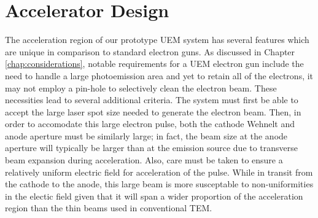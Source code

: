 
\section{Accelerator Design} \label{sec:gun_design}

The acceleration region of our prototype UEM system has several features which are unique in comparison to standard electron guns.
As discussed in Chapter \ref{chap:considerations}, notable requirements for a UEM electron gun include the need to handle a large photoemission area and yet to retain all of the electrons, it may not employ a pin-hole to selectively clean the electron beam.
These necessities lead to several additional criteria.
The system must first be able to accept the large laser spot size needed to generate the electron beam.
Then, in order to accomodate this large electron pulse, both the cathode Wehnelt and anode aperture must be similarly large; in fact, the beam size at the anode aperture will typically be larger than at the emission source due to transverse beam expansion during acceleration.
Also, care must be taken to ensure a relatively uniform electric field for acceleration of the pulse.
While in transit from the cathode to the anode, this large beam is more susceptable to non-uniformities in the electic field given that it will span a wider proportion %
of the acceleration region than the thin beams used in conventional TEM.

